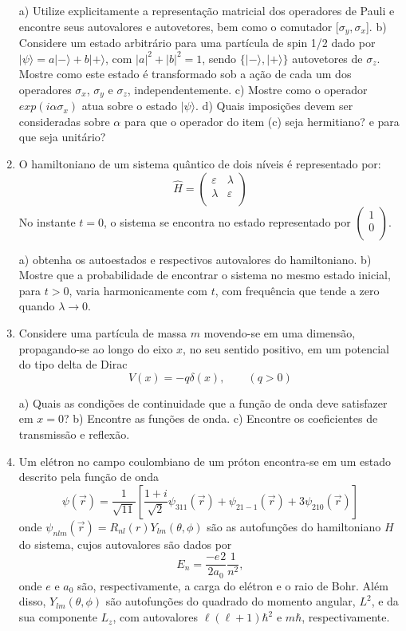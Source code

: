 \begin{enumerate}[start=1,label={\bfseries Q\arabic*.}]
a) Utilize explicitamente a representação matricial dos operadores de Pauli e encontre seus autovalores e autovetores, bem como o comutador [$\sigma_{y}, \sigma_{x}$].
b) Considere um estado arbitrário para uma partícula de spin 1/2 dado por $|\psi \rangle = a|-\rangle + b|+\rangle$, com $|a|^{2} + |b|^{2} = 1$, sendo $\{|-\rangle,|+\rangle \}$ autovetores de $\sigma_{z}$. Mostre como este estado é transformado sob a ação de cada um dos operadores  $\sigma_{x}$, $\sigma_{y}$ e $\sigma_{z}$, independentemente.
c) Mostre como o operador $exp(i \alpha \sigma_{x})$ atua sobre o estado $|\psi \rangle$.
d) Quais imposições devem ser consideradas sobre $\alpha$ para que o operador do item (c) seja hermitiano? e para que seja unitário?



\item O hamiltoniano de um sistema quântico de dois níveis é representado por:
$$
\hat{H} = \left(
  \begin{array}{cc}
    \varepsilon & \lambda \\
    \lambda & \varepsilon \\
  \end{array}
\right)
$$
No instante $t = 0$, o sistema se encontra no estado representado por $\left( \begin{array}{c} 1 \\ 0 \\ \end{array} \right)$.

  a) obtenha os autoestados e respectivos autovalores do hamiltoniano.
  b) Mostre que a probabilidade de encontrar o sistema no mesmo estado inicial, para $t > 0$, varia harmonicamente com $t$, com frequência que tende a zero quando $\lambda \rightarrow 0$.



\item Considere uma partícula de massa $m$ movendo-se em uma dimensão, propagando-se ao longo do eixo $x$, no seu sentido positivo, em um potencial do tipo delta de Dirac
$$
V(x) = -q \delta(x), \quad \quad (q>0)
$$

  a) Quais as condições de continuidade que a função de onda deve satisfazer em $x=0$?
  b) Encontre as funções de onda.
  c) Encontre os coeficientes de transmissão e reflexão.



\item Um elétron no campo coulombiano de um próton encontra-se em um estado descrito pela função de onda
$$
\psi(\vec{r}) = \frac{1}{\sqrt{11}} \left[ \frac{1+i}{\sqrt{2}} \psi_{311}(\vec{r}) + \psi_{21-1}(\vec{r}) + 3\psi_{210}(\vec{r})   \right]
$$
onde $\psi_{nlm}(\vec{r}) = R_{nl}(r) Y_{lm}(\theta, \phi)$ são as autofunções do hamiltoniano $H$ do sistema, cujos autovalores são dados por
$$
E_{n} = \frac{-e^{}2}{2a_{0}} \frac{1}{n^{2}},
$$
onde $e$ e $a_{0}$ são, respectivamente, a carga do elétron e o raio de Bohr. Além disso, $Y_{lm}(\theta, \phi)$ são autofunções do quadrado do momento angular, $L^{2}$, e da sua componente $L_{z}$, com autovalores $\ell(\ell + 1) \hbar^{2}$ e $m\hbar$, respectivamente.


\end{enumerate}
